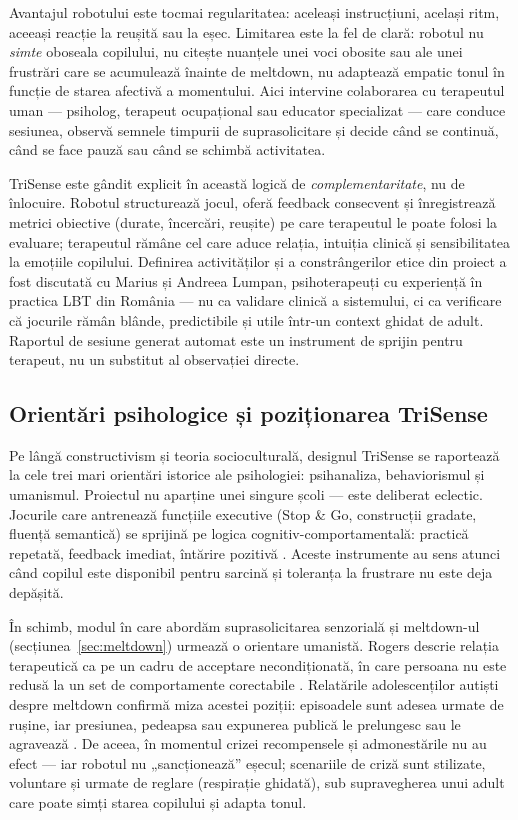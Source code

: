 Avantajul robotului este tocmai regularitatea: aceleași instrucțiuni, același ritm, aceeași reacție la reușită sau la eșec. Limitarea este la fel de clară: robotul nu \emph{simte} oboseala copilului, nu citește nuanțele unei voci obosite sau ale unei frustrări care se acumulează înainte de meltdown, nu adaptează empatic tonul în funcție de starea afectivă a momentului. Aici intervine colaborarea cu terapeutul uman — psiholog, terapeut ocupațional sau educator specializat — care conduce sesiunea, observă semnele timpurii de suprasolicitare și decide când se continuă, când se face pauză sau când se schimbă activitatea.

TriSense este gândit explicit în această logică de \emph{complementaritate}, nu de înlocuire. Robotul structurează jocul, oferă feedback consecvent și înregistrează metrici obiective (durate, încercări, reușite) pe care terapeutul le poate folosi la evaluare; terapeutul rămâne cel care aduce relația, intuiția clinică și sensibilitatea la emoțiile copilului. Definirea activităților și a constrângerilor etice din proiect a fost discutată cu Marius și Andreea Lumpan, psihoterapeuți cu experiență în practica LBT din România \cite{lumpanagerpres2025} — nu ca validare clinică a sistemului, ci ca verificare că jocurile rămân blânde, predictibile și utile într-un context ghidat de adult. Raportul de sesiune generat automat este un instrument de sprijin pentru terapeut, nu un substitut al observației directe.

\subsection{Orientări psihologice și poziționarea TriSense}
\label{sec:orientari-psihologice}

Pe lângă constructivism și teoria socioculturală, designul TriSense se raportează la cele trei mari orientări istorice ale psihologiei: psihanaliza, behaviorismul și umanismul. Proiectul nu aparține unei singure școli — este deliberat eclectic. Jocurile care antrenează funcțiile executive (Stop \& Go, construcții gradate, fluență semantică) se sprijină pe logica cognitiv-comportamentală: practică repetată, feedback imediat, întărire pozitivă \cite{diamond2013}. Aceste instrumente au sens atunci când copilul este disponibil pentru sarcină și toleranța la frustrare nu este deja depășită.

În schimb, modul în care abordăm suprasolicitarea senzorială și meltdown-ul (secțiunea~\ref{sec:meltdown}) urmează o orientare umanistă. Rogers descrie relația terapeutică ca pe un cadru de acceptare necondiționată, în care persoana nu este redusă la un set de comportamente corectabile \cite{rogers1951}. Relatările adolescenților autiști despre meltdown confirmă miza acestei poziții: episoadele sunt adesea urmate de rușine, iar presiunea, pedeapsa sau expunerea publică le prelungesc sau le agravează \cite{phung2021}. De aceea, în momentul crizei recompensele și admonestările nu au efect — iar robotul nu „sancționează” eșecul; scenariile de criză sunt stilizate, voluntare și urmate de reglare (respirație ghidată), sub supravegherea unui adult care poate simți starea copilului și adapta tonul.

